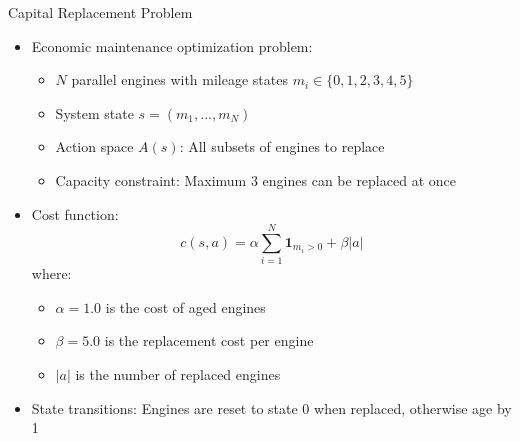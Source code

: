 \documentclass[10pt]{beamer}
\begin{document}
\begin{frame}{Capital Replacement Problem}
    \begin{itemize}
        \item Economic maintenance optimization problem:
        \begin{itemize}
            \item $N$ parallel engines with mileage states $m_i \in \{0,1,2,3,4,5\}$
            \item System state $s = (m_1,...,m_N)$
            \item Action space $A(s)$: All subsets of engines to replace
            \item Capacity constraint: Maximum 3 engines can be replaced at once
        \end{itemize}
        \vspace{0.2cm}
        \item Cost function:
        \begin{equation}
            c(s,a) = \alpha \sum_{i=1}^{N} \mathbf{1}_{m_i > 0} + \beta |a|
        \end{equation}
        where:
        \begin{itemize}
            \item $\alpha=1.0$ is the cost of aged engines
            \item $\beta=5.0$ is the replacement cost per engine
            \item $|a|$ is the number of replaced engines
        \end{itemize}
        \vspace{0.2cm}
        \item State transitions: Engines are reset to state 0 when replaced, otherwise age by 1
    \end{itemize}
\end{frame}

\end{document}

